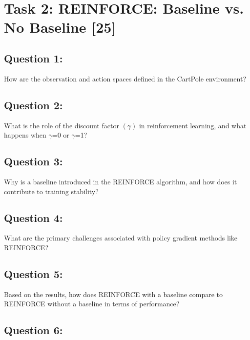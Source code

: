 \documentclass[12pt]{article}
\begin{document}
{{{\newpage

\section{Task 2: REINFORCE: Baseline vs. No Baseline [25]}

\subsection{Question 1:}

How are the observation and action spaces defined in the CartPole environment?
\vspace*{0.3cm}

\subsection{Question 2:}

What is the role of the discount factor $(\gamma)$ in reinforcement learning, and what happens when $\gamma$=0 or $\gamma$=1?
\vspace*{0.3cm}

\subsection{Question 3:}

Why is a baseline introduced in the REINFORCE algorithm, and how does it contribute to training stability?
\vspace*{0.3cm}

\subsection{Question 4:}

What are the primary challenges associated with policy gradient methods like REINFORCE?
\vspace*{0.3cm}

\subsection{Question 5:}

Based on the results, how does REINFORCE with a baseline compare to REINFORCE without a baseline in terms of performance?
\vspace*{0.3cm}

\subsection{Question 6:}

}}}
\end{document}
